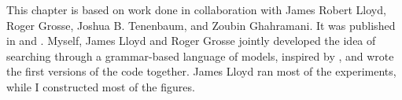 
This chapter is based on work done in collaboration with James Robert Lloyd, Roger Grosse, Joshua B. Tenenbaum, and Zoubin Ghahramani.
It was published in \citet{DuvLloGroetal13} and \citet{LloDuvGroetal14}.
Myself, James Lloyd and Roger Grosse jointly developed the idea of searching through a grammar-based language of \gp{} models, inspired by \citet{grosse2012exploiting}, and wrote the first versions of the code together.
James Lloyd ran most of the experiments, while I constructed most of the figures.




